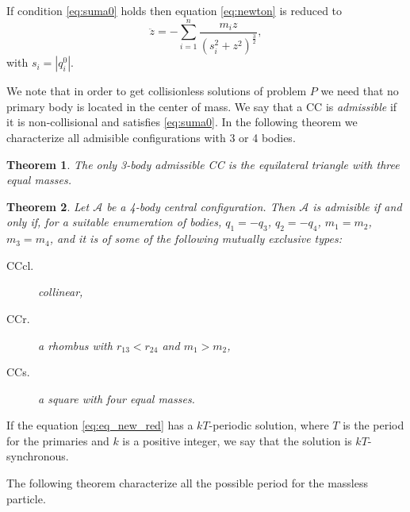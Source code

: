 \documentclass[twoside]{article}
\newtheorem{thm}{Theorem}[section]
\theoremstyle{remark}
\begin{document}
If condition \eqref{eq:suma0} holds then equation \eqref{eq:newton} is reduced to
\begin{equation}\label{eq:eq_new_red}
 \ddot{z}=-\sum_{i=1 }^n\frac{m_iz}{(s_i^2+z^2)^{\frac32}},
\end{equation}
with  $s_i=|q_i^0|$.




We note that in order to get collisionless solutions of problem $P$ we need that no primary body is located in the center of mass. We say that a
CC is \emph{admissible} if it is non-collisional and satisfies \eqref{eq:suma0}. In the following theorem we characterize all admisible configurations with 3 or 4 bodies.


\begin{thm}\label{thm:caracterizacion3}
The only 3-body admissible CC is the equilateral triangle with three equal masses.
\end{thm}




\begin{thm}\label{thm:caracterizacion4}
Let $\mathcal{A}$ be a 4-body central configuration. Then $\mathcal{A}$ is  admisible if and only if,  for a suitable enumeration  of bodies,   $q_1=-q_3$, $q_2=-q_4$, $m_1=m_2$,  $m_3=m_4$, and  it is of some of the following mutually exclusive types:
\begin{description}
\item[CCcl.]   collinear,
\item[CCr.]  a rhombus with $r_{13}<r_{24}$ and $m_1>m_2$,
\item[CCs.]  a square with four equal masses.
\end{description}


\end{thm}

If the equation \eqref{eq:eq_new_red} has a $kT$-periodic solution, where $T$ is the period for the primaries and $k$ is a positive integer, we say that the solution is  $kT$-synchronous.

The following theorem characterize all the possible period for the massless particle.
\end{document}

